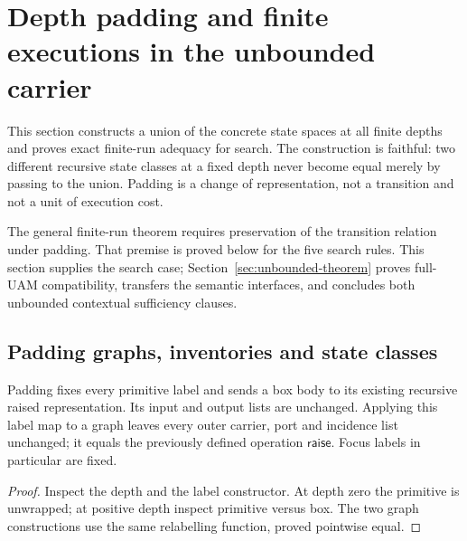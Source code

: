 \section{Depth padding and finite executions in the unbounded carrier}
\label{sec:unbounded-search}
This section constructs a union of the concrete state spaces at all finite
depths and proves exact finite-run adequacy for search. The construction is
faithful: two different recursive state classes at a fixed depth never become
equal merely by passing to the union. Padding is a change of representation,
not a transition and not a unit of execution cost.

The general finite-run theorem requires preservation of the transition
relation under padding. That premise is proved below for the five search
rules. This section supplies the search case; Section~\ref{sec:unbounded-theorem} proves full-UAM compatibility, transfers the semantic interfaces, and concludes both unbounded contextual sufficiency clauses.

\subsection{Padding graphs, inventories and state classes}



\begin{lemma}
Padding fixes every primitive label and sends a box body to its existing recursive raised representation. Its input and output lists are unchanged. Applying this label map to a graph leaves every outer carrier, port and incidence list unchanged; it equals the previously defined operation $\mathsf{raise}$. Focus labels in particular are fixed.
\end{lemma}

\begin{proof}
Inspect the depth and the label constructor. At depth zero the primitive is unwrapped; at positive depth inspect primitive versus box. The two graph constructions use the same relabelling function, proved pointwise equal.
\end{proof}




